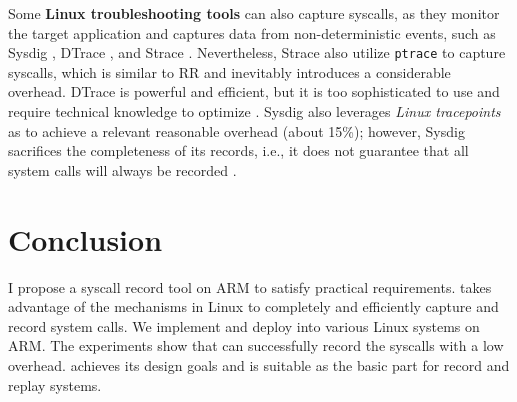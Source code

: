 Some \textbf{Linux troubleshooting tools} can also capture syscalls, as they monitor the target application and captures data
from non-deterministic events, such as Sysdig \cite{github_sysdig_2021}, DTrace
\cite{gregg_dtrace_2019,gregg_dtrace_2011}, and Strace \cite{github_strace_2021}.
Nevertheless, Strace \cite{github_strace_2021} also utilize \texttt{ptrace} to capture syscalls, which is similar to RR and inevitably introduces a considerable overhead. DTrace is powerful and efficient, but it is too sophisticated to use and require technical knowledge to optimize \cite{gregg_dtrace_2011}. Sysdig also leverages \textit{Linux tracepoints} as \TheName to achieve a relevant reasonable overhead (about 15\%); however, Sysdig sacrifices the completeness of its records, i.e., it does not guarantee that all system calls will always be recorded \cite{degioanni_sysdig_2014}.





\section{Conclusion}

I propose a syscall record tool \TheName on ARM to satisfy practical requirements. \TheName takes advantage of the mechanisms in Linux to completely and efficiently capture and record system calls. We implement and deploy \TheName into various Linux systems on ARM. The experiments show that \TheName can successfully record the syscalls with a low overhead.
\TheName achieves its design goals and is suitable as the basic part for record and replay systems. 